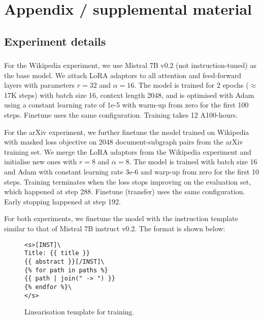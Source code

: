 \section{Appendix / supplemental material}

\subsection{Experiment details}  \label{appendix:exp-details}

\subsubsection{\name}  \label{appendix:training-details}

For the Wikipedia experiment, we use Mistral 7B v0.2 (not instruction-tuned) \cite{jiang2023mistral} as the base model. We attach LoRA \cite{hu2021lora} adaptors to all attention and feed-forward layers with parameters $r=32$ and $\alpha=16$. The model is trained for 2 epochs ($\approx$ 17K steps) with batch size 16, context length 2048, and is optimised with Adam using a constant learning rate of 1e-5 with warm-up from zero for the first 100 steps. Finetune uses the same configuration. Training takes 12 A100-hours.

For the arXiv experiment, we further finetune the model trained on Wikipedia with masked loss objective on 2048 document-subgraph pairs from the arXiv training set. We merge the LoRA adaptors from the Wikipedia experiment and initialise new ones with $r=8$ and $\alpha=8$. The model is trained with batch size 16 and Adam with constant learning rate 3e-6 and warp-up from zero for the first 10 steps. Training terminates when the loss stops improving on the evaluation set, which happened at step 288. Finetune (transfer) uses the same configuration. Early stopping happened at step 192.

For both experiments, we finetune the model with the instruction template similar to that of Mistral 7B instruct v0.2. The format is shown below:

\begin{figure}[h]
\centering
\begin{lstlisting}[frame=single]
<s>[INST]\
Title: {{ title }}
{{ abstract }}[/INST]\
{% for path in paths %}
{{ path | join(" -> ") }}
{% endfor %}\
</s>
\end{lstlisting}
\caption{Linearisation template for \name training.}
\label{fig:linearisation-template}
\end{figure}

